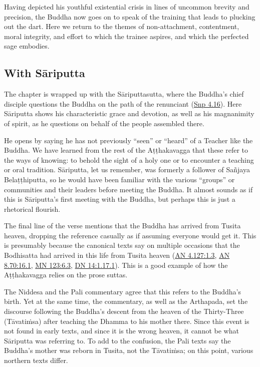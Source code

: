 \documentclass[12pt,openany]{book}%
\begin{document}
Having depicted his youthful existential crisis in lines of uncommon brevity and precision, the Buddha now goes on to speak of the training that leads to plucking out the dart. Here we return to the themes of non-attachment, contentment, moral integrity, and effort to which the trainee aspires, and which the perfected sage embodies.

\subsection*{With \textsanskrit{Sāriputta}}

The chapter is wrapped up with the \textsanskrit{Sāriputtasutta}, where the Buddha’s chief disciple questions the Buddha on the path of the renunciant (\href{https://suttacentral.net/snp4.16/en/sujato}{Snp 4.16}). Here \textsanskrit{Sāriputta} shows his characteristic grace and devotion, as well as his magnanimity of spirit, as he questions on behalf of the people assembled there.

He opens by saying he has not previously “seen” or “heard” of a Teacher like the Buddha. We have learned from the rest of the \textsanskrit{Aṭṭhakavagga} that these refer to the ways of knowing: to behold the sight of a holy one or to encounter a teaching or oral tradition. \textsanskrit{Sāriputta}, let us remember, was formerly a follower of \textsanskrit{Sañjaya} \textsanskrit{Belaṭṭhiputta}, so he would have been familiar with the various “groups” or communities and their leaders before meeting the Buddha. It almost sounds as if this is \textsanskrit{Sāriputta}’s first meeting with the Buddha, but perhaps this is just a rhetorical flourish.

The final line of the verse mentions that the Buddha has arrived from Tusita heaven, dropping the reference casually as if assuming everyone would get it. This is presumably because the canonical texts say on multiple occasions that the Bodhisatta had arrived in this life from Tusita heaven (\href{https://suttacentral.net/an4.127/en/sujato\#1.3}{AN 4.127:1.3}, \href{https://suttacentral.net/an8.70/en/sujato\#16.1}{AN 8.70:16.1}, \href{https://suttacentral.net/mn123/en/sujato\#6.3}{MN 123:6.3}, \href{https://suttacentral.net/dn14/en/sujato\#1.17.1}{DN 14:1.17.1}). This is a good example of how the \textsanskrit{Aṭṭhakavagga} relies on the prose suttas.

The Niddesa and the Pali commentary agree that this refers to the Buddha’s birth. Yet at the same time, the commentary, as well as the Arthapada, set the discourse following the Buddha’s descent from the heaven of the Thirty-Three (\textsanskrit{Tāvatiṁsa}) after teaching the Dhamma to his mother there. Since this event is not found in early texts, and since it is the wrong heaven, it cannot be what \textsanskrit{Sāriputta} was referring to. To add to the confusion, the Pali texts say the Buddha’s mother was reborn in Tusita, not the \textsanskrit{Tāvatiṁsa}; on this point, various northern texts differ.
\end{document}
